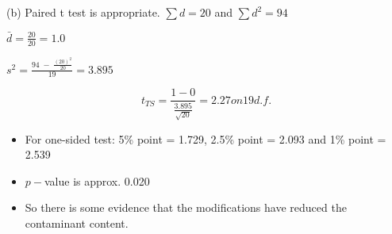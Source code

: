 \documentclass[a4paper,12pt]{article}
\begin{document}
(b)
Paired t test is appropriate.
$\sum d = 20$ and $\sum d^2 = 94$

$ \bar{d} = \frac{20}{20} = 1.0$

$ s^2 =  \frac{ 94 \; -\; \frac{(20)^2}{20} }{ 19 }  =   3.895 $

\[t_{TS} = \frac{1-0}{  \frac{3.895}{\sqrt{20} } } = 2.27 on 19 d.f. \]




\begin{itemize}
\item  For one-sided test: 5\% point = 1.729, 2.5\% point = 2.093 and 1\% point = 2.539
\item $p-$value is approx. 0.020
\item So there is some evidence that the modifications have reduced the contaminant content.
\end{itemize}
\end{document}
